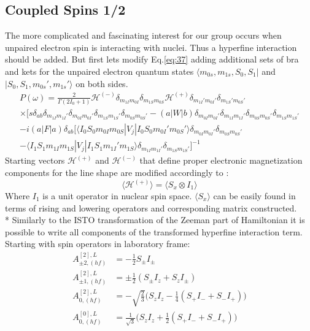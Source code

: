 \subsection{Coupled Spins 1/2}
The more complicated and fascinating interest for our group occurs when unpaired electron spin is interacting with nuclei. Thus a hyperfine interaction should be added. But first lets modify Eq.\ref{eq:37} adding additional sets of bra and kets for the unpaired electron quantum states $\langle m_{0s},m_{1s},S_0,S_1|$ and $|S_0,S_1,m_{0s}',m_{1s}'\rangle$ on both sides.  
\begin{multline}\label{eq:newbras}
P(\omega)=
\frac{2}{\Gamma(2I_0+1)}\mathcal{H}^{(-)}\delta_{m_{1I}m_{0I}}\delta_{m_{1S}m_{0S}}\mathcal{H}^{(+)}\delta_{m_{1I}'m_{0I}'}\delta_{m_{1S}'m_{0S}'} \\ \times[s\delta_{ab}\delta_{m_{1I}m_{1I}'}\delta_{m_{0I}m_{0I}'}\delta_{m_{1S}m_{1S}'}\delta_{m_{0S}m_{0S}'}-(a|W|b)\delta_{m_{0I}m_{0I}'}\delta_{m_{1I}m_{1I}'}\delta_{m_{0S}m_{0S}'}\delta_{m_{1S}m_{1S}'} \\ -i(a|F|a)\delta_{ab}[\langle I_0S_0m_{0I}m_{0S}|V_j|I_0S_0m_{0I}'m_{0S}'\rangle \delta_{m_{0I}m_{0I}'}\delta_{m_{0S}m_{0S}'}\\-\langle I_1S_1m_{1I}m_{1S}|V_j|I_1S_1m_{1I}'m_{1S}\rangle\delta_{m_{1I}m_{1I}'}\delta_{m_{1S}m_{1S}'}]^{-1}
\end{multline} 
Starting vectors $\mathcal{H}^{(+)}$ and $\mathcal{H}^{(-)}$ that define proper electronic magnetization components for the line shape are modified accordingly to \cite{bmr}: 
\begin{equation}
\langle \mathcal{H}^{(+)} \rangle=\langle S_x\otimes I_1 \rangle
\end{equation}
Where $I_1$ is a unit operator in nuclear spin space. $\langle S_x\rangle$ can be easily found in terms of rising and lowering operators and corresponding matrix constructed. \\*
Similarly to the ISTO transformation of the Zeeman part of Hamiltonian it is possible to write all components of the transformed hyperfine interaction term. Starting with spin operators in laboratory frame:   
\begin{subequations}\label{eq:hyperA}
\begin{align}
A^{[2],L}_{\pm2,(hf)} & =-\frac{1}{2}S_{\pm}I_{\pm}\\
A^{[2],L}_{\pm1,(hf)} & =\pm\frac{1}{2}(S_{\pm}I_{z}+S_zI_{\pm})\\
A^{[2],L}_{0,(hf)} & =-\sqrt{\frac{2}{3}}\big(S_{z}I_{z}-\frac{1}{4}(S_+I_-+S_-I_+)\big)\\
A^{[0],L}_{0,(hf)} & =\frac{1}{\sqrt{3}}\big(S_{z}I_{z}+\frac{1}{2}(S_+I_-+S_-I_+)\big)
\end{align}
\end{subequations}
